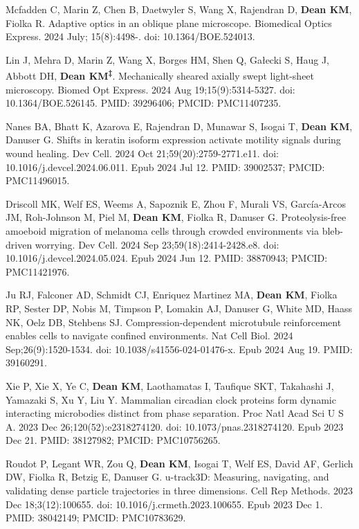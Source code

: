 \begin{etaremune}
\item Mcfadden C, Marin Z, Chen B, Daetwyler S, Wang X, Rajendran D, \textbf{Dean KM}, Fiolka R. Adaptive optics in an oblique plane microscope. Biomedical Optics Express. 2024 July; 15(8):4498-. doi: 10.1364/BOE.524013.

\item Lin J, Mehra D, Marin Z, Wang X, Borges HM, Shen Q, Gałecki S, Haug J, Abbott DH, \textbf{Dean KM\textsuperscript{‡}}. Mechanically sheared axially swept light-sheet microscopy. Biomed Opt Express. 2024 Aug 19;15(9):5314-5327. doi: 10.1364/BOE.526145. PMID: 39296406; PMCID: PMC11407235.

\item Nanes BA, Bhatt K, Azarova E, Rajendran D, Munawar S, Isogai T, \textbf{Dean KM}, Danuser G. Shifts in keratin isoform expression activate motility signals during wound healing. Dev Cell. 2024 Oct 21;59(20):2759-2771.e11. doi: 10.1016/j.devcel.2024.06.011. Epub 2024 Jul 12. PMID: 39002537; PMCID: PMC11496015.

\item Driscoll MK, Welf ES, Weems A, Sapoznik E, Zhou F, Murali VS, García-Arcos JM, Roh-Johnson M, Piel M, \textbf{Dean KM}, Fiolka R, Danuser G. Proteolysis-free amoeboid migration of melanoma cells through crowded environments via bleb-driven worrying. Dev Cell. 2024 Sep 23;59(18):2414-2428.e8. doi: 10.1016/j.devcel.2024.05.024. Epub 2024 Jun 12. PMID: 38870943; PMCID: PMC11421976.

\item Ju RJ, Falconer AD, Schmidt CJ, Enriquez Martinez MA, \textbf{Dean KM}, Fiolka RP, Sester DP, Nobis M, Timpson P, Lomakin AJ, Danuser G, White MD, Haass NK, Oelz DB, Stehbens SJ. Compression-dependent microtubule reinforcement enables cells to navigate confined environments. Nat Cell Biol. 2024 Sep;26(9):1520-1534. doi: 10.1038/s41556-024-01476-x. Epub 2024 Aug 19. PMID: 39160291.

\item Xie P, Xie X, Ye C, \textbf{Dean KM}, Laothamatas I, Taufique SKT, Takahashi J, Yamazaki S, Xu Y, Liu Y. Mammalian circadian clock proteins form dynamic interacting microbodies distinct from phase separation. Proc Natl Acad Sci U S A. 2023 Dec 26;120(52):e2318274120. doi: 10.1073/pnas.2318274120. Epub 2023 Dec 21. PMID: 38127982; PMCID: PMC10756265.

\item Roudot P, Legant WR, Zou Q, \textbf{Dean KM}, Isogai T, Welf ES, David AF, Gerlich DW, Fiolka R, Betzig E, Danuser G. u-track3D: Measuring, navigating, and validating dense particle trajectories in three dimensions. Cell Rep Methods. 2023 Dec 18;3(12):100655. doi: 10.1016/j.crmeth.2023.100655. Epub 2023 Dec 1. PMID: 38042149; PMCID: PMC10783629.


\end{etaremune}

